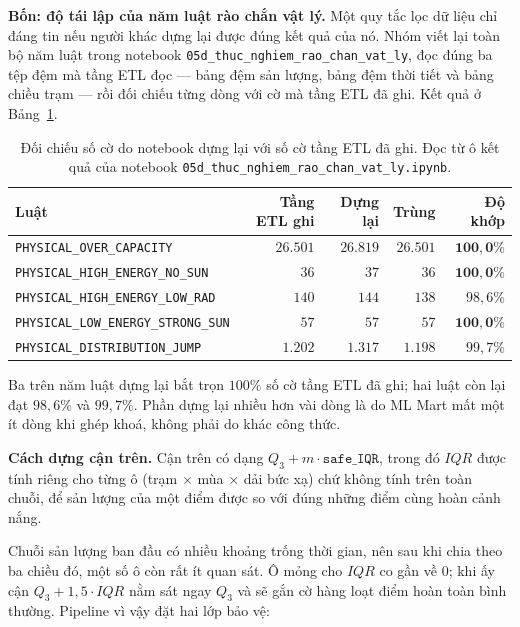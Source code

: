 \documentclass[12pt, a4paper]{report}
\begin{document}
\textbf{Bốn: độ tái lập của năm luật rào chắn vật lý.} Một quy tắc lọc dữ liệu chỉ đáng
tin nếu người khác dựng lại được đúng kết quả của nó. Nhóm viết lại toàn bộ năm luật trong
notebook \texttt{05d\_thuc\_nghiem\_rao\_chan\_vat\_ly}, đọc đúng ba tệp đệm mà tầng ETL đọc --- bảng
đệm sản lượng, bảng đệm thời tiết và bảng chiều trạm --- rồi đối chiếu từng dòng với cờ mà
tầng ETL đã ghi. Kết quả ở Bảng~\ref{tab:tai_lap_luat}.

\begin{table}[htbp]
\centering
\caption{Đối chiếu số cờ do notebook dựng lại với số cờ tầng ETL đã ghi. Đọc từ ô kết quả
của notebook \texttt{05d\_thuc\_nghiem\_rao\_chan\_vat\_ly.ipynb}.}
\label{tab:tai_lap_luat}
\small
\begin{tabular}{l r r r r}
\toprule
\textbf{Luật} & \textbf{Tầng ETL ghi} & \textbf{Dựng lại} & \textbf{Trùng} & \textbf{Độ khớp} \\
\midrule
\texttt{PHYSICAL\_OVER\_CAPACITY}          & $26.501$ & $26.819$ & $26.501$ & $\mathbf{100{,}0\%}$ \\
\texttt{PHYSICAL\_HIGH\_ENERGY\_NO\_SUN}   & $36$     & $37$     & $36$     & $\mathbf{100{,}0\%}$ \\
\texttt{PHYSICAL\_HIGH\_ENERGY\_LOW\_RAD}  & $140$    & $144$    & $138$    & $98{,}6\%$ \\
\texttt{PHYSICAL\_LOW\_ENERGY\_STRONG\_SUN}& $57$     & $57$     & $57$     & $\mathbf{100{,}0\%}$ \\
\texttt{PHYSICAL\_DISTRIBUTION\_JUMP}      & $1.202$  & $1.317$  & $1.198$  & $99{,}7\%$ \\
\bottomrule
\end{tabular}
\end{table}

Ba trên năm luật dựng lại bắt trọn $100\%$ số cờ tầng ETL đã ghi; hai luật còn lại đạt
$98{,}6\%$ và $99{,}7\%$. Phần dựng lại nhiều hơn vài dòng là do ML Mart mất một ít dòng khi
ghép khoá, không phải do khác công thức.

\textbf{Cách dựng cận trên.} Cận trên có dạng $Q_3 + m \cdot \texttt{safe\_IQR}$, trong đó
$IQR$ được tính riêng cho từng ô (trạm $\times$ mùa $\times$ dải bức xạ) chứ không
tính trên toàn chuỗi, để sản lượng của một điểm được so với đúng những điểm cùng hoàn cảnh
nắng.

Chuỗi sản lượng ban đầu có nhiều khoảng trống thời gian, nên sau khi chia theo ba chiều đó,
một số ô còn rất ít quan sát. Ô mỏng cho $IQR$ co gần về $0$; khi ấy cận
$Q_3 + 1{,}5 \cdot IQR$ nằm sát ngay $Q_3$ và sẽ gắn cờ hàng loạt điểm hoàn toàn bình
thường. Pipeline vì vậy đặt hai lớp bảo vệ:
\end{document}
